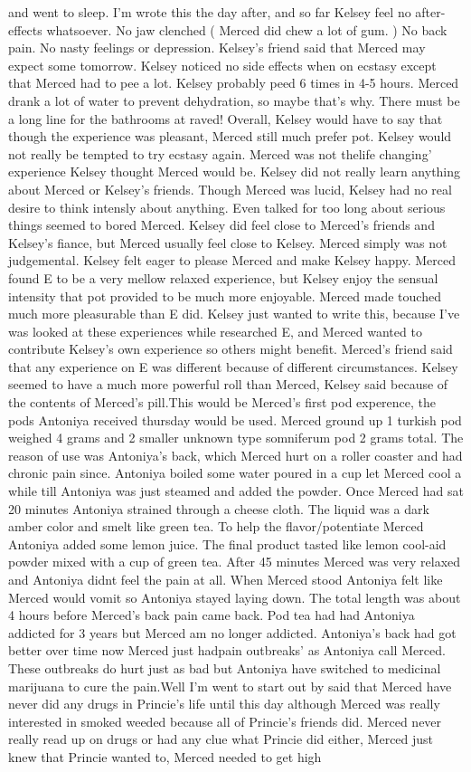 \documentclass[12pt]{book}
\begin{document}
and went to sleep. I'm wrote this the day after, and so far Kelsey feel no after-effects whatsoever. No jaw clenched ( Merced did chew a lot of gum. ) No back pain. No nasty feelings or depression. Kelsey's friend said that Merced may expect some tomorrow. Kelsey noticed no side effects when on ecstasy except that Merced had to pee a lot. Kelsey probably peed 6 times in 4-5 hours. Merced drank a lot of water to prevent dehydration, so maybe that's why. There must be a long line for the bathrooms at raved! Overall, Kelsey would have to say that though the experience was pleasant, Merced still much prefer pot. Kelsey would not really be tempted to try ecstasy again. Merced was not thelife changing' experience Kelsey thought Merced would be. Kelsey did not really learn anything about Merced or Kelsey's friends. Though Merced was lucid, Kelsey had no real desire to think intensly about anything. Even talked for too long about serious things seemed to bored Merced. Kelsey did feel close to Merced's friends and Kelsey's fiance, but Merced usually feel close to Kelsey. Merced simply was not judgemental. Kelsey felt eager to please Merced and make Kelsey happy. Merced found E to be a very mellow relaxed experience, but Kelsey enjoy the sensual intensity that pot provided to be much more enjoyable. Merced made touched much more pleasurable than E did. Kelsey just wanted to write this, because I've was looked at these experiences while researched E, and Merced wanted to contribute Kelsey's own experience so others might benefit. Merced's friend said that any experience on E was different because of different circumstances. Kelsey seemed to have a much more powerful roll than Merced, Kelsey said because of the contents of Merced's pill.This would be Merced's first pod experence, the pods Antoniya received thursday would be used. Merced ground up 1 turkish pod weighed 4 grams and 2 smaller unknown type somniferum pod 2 grams total. The reason of use was Antoniya's back, which Merced hurt on a roller coaster and had chronic pain since. Antoniya boiled some water poured in a cup let Merced cool a while till Antoniya was just steamed and added the powder. Once Merced had sat 20 minutes Antoniya strained through a cheese cloth. The liquid was a dark amber color and smelt like green tea. To help the flavor/potentiate Merced Antoniya added some lemon juice. The final product tasted like lemon cool-aid powder mixed with a cup of green tea. After 45 minutes Merced was very relaxed and Antoniya didnt feel the pain at all. When Merced stood Antoniya felt like Merced would vomit so Antoniya stayed laying down. The total length was about 4 hours before Merced's back pain came back. Pod tea had had Antoniya addicted for 3 years but Merced am no longer addicted. Antoniya's back had got better over time now Merced just hadpain outbreaks' as Antoniya call Merced. These outbreaks do hurt just as bad but Antoniya have switched to medicinal marijuana to cure the pain.Well I'm went to start out by said that Merced have never did any drugs in Princie's life until this day although Merced was really interested in smoked weeded because all of Princie's friends did. Merced never really read up on drugs or had any clue what Princie did either, Merced just knew that Princie wanted to, Merced needed to get high 
\end{document}
